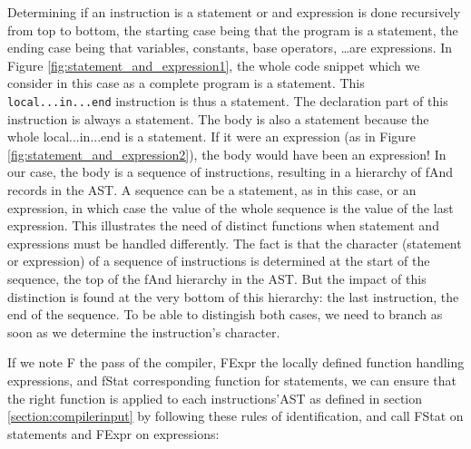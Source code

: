 \documentclass[a4paper]{memoir}
\begin{document}
Determining if an instruction is a statement or and expression is done
recursively from top to bottom, the starting case being that the program is a
statement, the ending case being that variables, constants, base operators,
\ldots are expressions.  In Figure \ref{fig:statement_and_expression1}, the
whole code snippet which we consider in this case as a complete program is a
statement. This \lstinline!local...in...end! instruction is thus a statement.
The declaration part of this instruction is always a statement. The body is
also a statement because the whole local...in...end is a statement. If it were
an expression (as in Figure \ref{fig:statement_and_expression2}), the body
would have been an expression! In our case, the body is a sequence of
instructions, resulting in a hierarchy of fAnd records in the AST. A sequence
can be a statement, as in this case, or an expression, in which case the value
of the whole sequence is the value of the last expression. This illustrates the
need of distinct functions when statement and expressions must be handled
differently. The fact is that the character (statement or
expression) of a sequence of instructions is determined at the start of the
sequence, the top of the fAnd hierarchy in the AST. But the impact of this
distinction is found at the very bottom of this hierarchy: the last
instruction, the end of the sequence. To be able to distingish both cases, we
need to branch as soon as we determine the instruction's character.

If we note F the pass of the compiler, FExpr the locally defined function handling expressions, and fStat corresponding function for statements, we can ensure that the right function is applied to each instructions'AST as defined in section \ref{section:compilerinput} by following these rules of identification, and call FStat on statements and FExpr on expressions:
\end{document}
